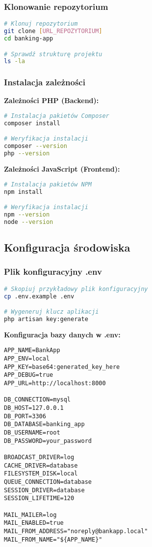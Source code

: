 \documentclass[12pt,a4paper]{article}
\begin{document}
    \subsubsection{Klonowanie repozytorium}

    \begin{lstlisting}[language=bash, caption=Klonowanie projektu]
# Klonuj repozytorium
git clone [URL_REPOZYTORIUM]
cd banking-app

# Sprawdź strukturę projektu
ls -la
    \end{lstlisting}

    \subsubsection{Instalacja zależności}

    \textbf{Zależności PHP (Backend):}
    \begin{lstlisting}[language=bash, caption=Instalacja zależności PHP]
# Instalacja pakietów Composer
composer install

# Weryfikacja instalacji
composer --version
php --version
    \end{lstlisting}

    \textbf{Zależności JavaScript (Frontend):}
    \begin{lstlisting}[language=bash, caption=Instalacja zależności JavaScript]
# Instalacja pakietów NPM
npm install

# Weryfikacja instalacji
npm --version
node --version
    \end{lstlisting}

    \subsection{Konfiguracja środowiska}

    \subsubsection{Plik konfiguracyjny .env}

    \begin{lstlisting}[language=bash, caption=Przygotowanie pliku .env]
# Skopiuj przykładowy plik konfiguracyjny
cp .env.example .env

# Wygeneruj klucz aplikacji
php artisan key:generate
    \end{lstlisting}

    \textbf{Konfiguracja bazy danych w .env:}
    \begin{lstlisting}[caption=Przykładowa konfiguracja bazy danych]
APP_NAME=BankApp
APP_ENV=local
APP_KEY=base64:generated_key_here
APP_DEBUG=true
APP_URL=http://localhost:8000

DB_CONNECTION=mysql
DB_HOST=127.0.0.1
DB_PORT=3306
DB_DATABASE=banking_app
DB_USERNAME=root
DB_PASSWORD=your_password

BROADCAST_DRIVER=log
CACHE_DRIVER=database
FILESYSTEM_DISK=local
QUEUE_CONNECTION=database
SESSION_DRIVER=database
SESSION_LIFETIME=120

MAIL_MAILER=log
MAIL_ENABLED=true
MAIL_FROM_ADDRESS="noreply@bankapp.local"
MAIL_FROM_NAME="${APP_NAME}"
    \end{lstlisting}
\end{document}
